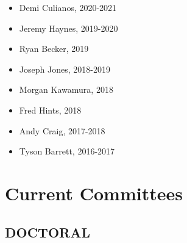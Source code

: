 \documentclass[11pt,a4paper,]{moderncv}
\providecommand{\tightlist}{%
	\setlength{\itemsep}{0pt}\setlength{\parskip}{0pt}}
\begin{document}
\begin{itemize}
\tightlist
\item
  Demi Culianos, 2020-2021
\item
  Jeremy Haynes, 2019-2020
\item
  Ryan Becker, 2019
\item
  Joseph Jones, 2018-2019
\item
  Morgan Kawamura, 2018
\item
  Fred Hints, 2018
\item
  Andy Craig, 2017-2018
\item
  Tyson Barrett, 2016-2017
\end{itemize}

\vspace{7 mm}

\hypertarget{current-committees}{%
\section{Current Committees}\label{current-committees}}

\hypertarget{doctoral}{%
\subsection{\texorpdfstring{\textbf{DOCTORAL}}{DOCTORAL}}\label{doctoral}}
\end{document}
